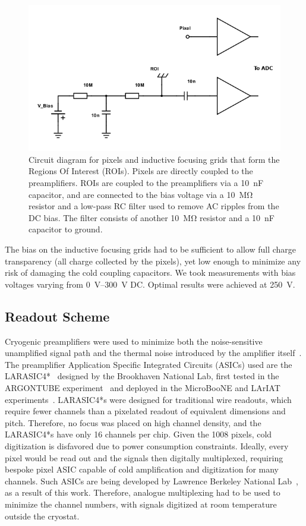 \documentclass[instruments,article,accept,moreauthors,pdftex]{Definitions/mdpi}
\begin{document}
\begin{figure}[H]
	\centering
	\includegraphics[width=0.65\linewidth]{Figures/schemeit-project_mod}
	\caption{Circuit diagram for pixels and inductive focusing grids that form the Regions Of Interest (ROIs). Pixels are directly coupled to the preamplifiers. ROIs are coupled to the preamplifiers via a \SI{10}{\nano\farad} capacitor, and are connected to the bias voltage via a \SI{10}{\mega\ohm} resistor and a low-pass RC filter used to remove AC ripples from the DC bias. The filter consists of another \SI{10}{\mega\ohm} resistor and a \SI{10}{\nano\farad} capacitor to ground.}
	\label{fig:circuit}
\end{figure}

The bias on the inductive focusing grids had to be sufficient to allow full charge transparency (all charge collected by the pixels), yet low enough to minimize any risk of damaging the cold coupling capacitors.
We took measurements with bias voltages varying from \SIrange{0}{300}{\volt} DC.
Optimal results were achieved at \SI{250}{\volt}.

\subsection{Readout Scheme}

Cryogenic preamplifiers were used to minimize both the noise-sensitive unamplified signal path and the thermal noise introduced by the amplifier itself~\cite{art_cold_ero}.
The preamplifier Application Specific Integrated Circuits (ASICs) used are the LARASIC4*~\cite{larasic} designed by the Brookhaven National Lab, first tested in the ARGONTUBE experiment~\cite{art_cold_ero} and deployed in the MicroBooNE and LArIAT experiments~\cite{uboner,lariat}.
LARASIC4*s were designed for traditional wire readouts, which require fewer channels than a pixelated readout of equivalent dimensions and pitch. 
Therefore, no focus was placed on high channel density, and the LARASIC4*s have only 16 channels per chip.
Given the 1008 pixels, cold digitization is disfavored due to power consumption constraints. 
Ideally, every pixel would be read out and the signals then digitally multiplexed, requiring bespoke pixel ASIC capable of cold amplification and digitization for many channels.
Such ASICs are being developed by Lawrence Berkeley National Lab~\cite{larpix}, as a result of this work. 
Therefore, analogue multiplexing had to be used to minimize the channel numbers, with signals digitized at room temperature outside the cryostat.
\end{document}
